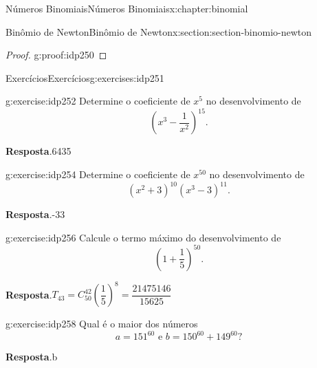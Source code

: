 \documentclass[oneside,10pt,]{book}
\newcommand{\blocktitlefont}{\relax}
\numberwithin{equation}{section}
\begin{document}
\begin{chapterptx}{Números Binomiais}{}{Números Binomiais}{}{}{x:chapter:binomial}
\begin{sectionptx}{Binômio de Newton}{}{Binômio de Newton}{}{}{x:section:section-binomio-newton}
\begin{proof}{}{g:proof:idp250}
%
\end{proof}
%
%
\typeout{************************************************}
\typeout{************************************************}
%
\begin{exercises-subsection}{Exercícios}{}{Exercícios}{}{}{g:exercises:idp251}
\begin{divisionexercise}{1}{}{}{g:exercise:idp252}%
Determine o coeficiente de \(x^5\) no desenvolvimento de%
\begin{equation*}
\left( x^3 - \frac{1}{x^2} \right)^{15}.
\end{equation*}
%
\par\smallskip%
\noindent\textbf{\blocktitlefont Resposta}.\hypertarget{g:answer:idp253}{}\quad{}6435%
\end{divisionexercise}%
\begin{divisionexercise}{2}{}{}{g:exercise:idp254}%
Determine o coeficiente de \(x^{50}\) no desenvolvimento de%
\begin{equation*}
(x^2+3)^{10}(x^3-3)^{11}.
\end{equation*}
%
\par\smallskip%
\noindent\textbf{\blocktitlefont Resposta}.\hypertarget{g:answer:idp255}{}\quad{}-33%
\end{divisionexercise}%
\begin{divisionexercise}{3}{}{}{g:exercise:idp256}%
Calcule o termo máximo do desenvolvimento de%
\begin{equation*}
\left(1+\frac{1}{5}\right)^{50}.
\end{equation*}
%
\par\smallskip%
\noindent\textbf{\blocktitlefont Resposta}.\hypertarget{g:answer:idp257}{}\quad{}\(T_{43} = C_{50}^{42}\left(\dfrac{1}{5}\right)^{8} = \dfrac{21475146}{15625}\)%
\end{divisionexercise}%
\begin{divisionexercise}{4}{}{}{g:exercise:idp258}%
Qual é o maior dos números%
%
\begin{equation*}
a = 151^{60} \text{ e } b = 150^{60} + 149^{60}? 
\end{equation*}
\par\smallskip%
\noindent\textbf{\blocktitlefont Resposta}.\hypertarget{g:answer:idp259}{}\quad{}b%
\end{divisionexercise}%
\end{exercises-subsection}
\end{sectionptx}
%
%
\typeout{************************************************}

\end{chapterptx}
\end{document}
